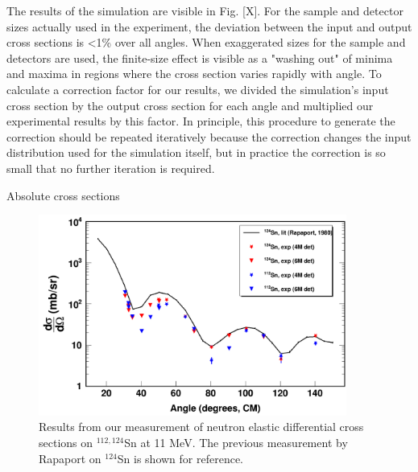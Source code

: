 The results of the simulation are visible in Fig. [X]. For the sample and
detector sizes actually used in the experiment, the deviation between the input
and output cross sections is <1\% over all angles. When exaggerated sizes for the
sample and detectors are used, the finite-size effect is visible as a "washing
out" of minima and maxima in regions where the cross section varies rapidly with
angle. To calculate a correction factor for our results, we divided the simulation's
input cross section by the output cross section for each angle and multiplied our
experimental results by this factor. In principle, this procedure to generate
the correction should be repeated iteratively because the correction changes the input distribution 
used for the simulation itself, but in practice the correction is so small
that no further iteration is required.

Absolute cross sections 

\begin{figure}
  \begin{center}
\includegraphics[width = 0.9\textwidth]{figures/neutronECS_Sn_11MeV.png}
\caption{Results from our measurement of neutron elastic differential cross sections on $^{112,124}$Sn at 11
MeV. The previous measurement by Rapaport on $^{124}$Sn \cite{Rapaport1980} is
shown for reference.} \label{SnECS_11MeV}
\end{center}
\end{figure}

